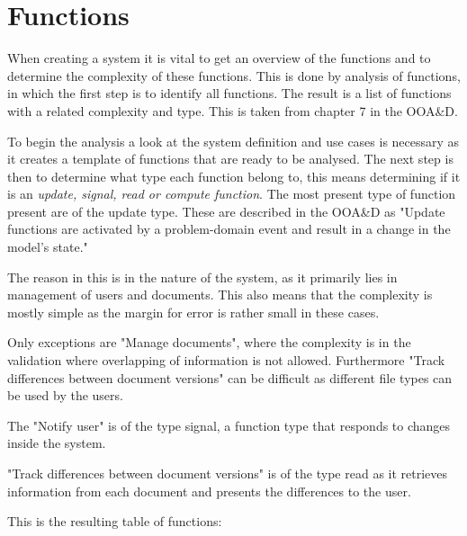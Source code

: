 \section{Functions}
When creating a system it is vital to get an overview of the functions and to determine the complexity of these functions. This is done by analysis of functions, in which the first step is to identify all functions. The result is a list of functions with a related complexity and type. This is taken from chapter 7 in the OOA\&D.\citep[ch.~7]{Rod-Aalborg}

To begin the analysis a look at the system definition and use cases is necessary as it creates a template of functions that are ready to be analysed. The next step is then to determine what type each function belong to, this means determining if it is an \textit{update, signal, read or compute function}. The most present type of function present are of the update type. These are described in the OOA\&D as "Update functions are activated by a problem-domain event and result in a change in the model's state."\citep[p.~140]{Rod-Aalborg}


The reason in this is in the nature of the system, as it primarily lies in management of users and documents. This also means that the complexity is mostly simple as the margin for error is rather small in these cases. 

Only exceptions are "Manage documents", where the complexity is in the validation where overlapping of information is not allowed. Furthermore "Track differences between document versions" can be difficult as different file types can be used by the users.

The "Notify user" is of the type signal, a function type that responds to changes inside the system.

"Track differences between document versions" is of the type read as it retrieves information from each document and presents the differences to the user.

This is the resulting table of functions:

